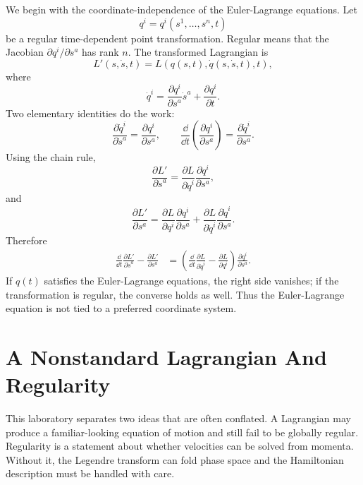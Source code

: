 We begin with the coordinate-independence of the Euler-Lagrange equations. Let
\[
  q^i=q^i(s^1,\ldots,s^n,t)
\]
be a regular time-dependent point transformation. Regular means that the
Jacobian \(\partial q^i/\partial s^a\) has rank \(n\). The transformed
Lagrangian is
\[
  L'(s,\dot s,t)=L(q(s,t),\dot q(s,\dot s,t),t),
\]
where
\[
  \dot q^i
  =
  \frac{\partial q^i}{\partial s^a}\dot s^a
  +
  \frac{\partial q^i}{\partial t}.
\]
Two elementary identities do the work:
\[
  \frac{\partial \dot q^i}{\partial \dot s^a}
  =
  \frac{\partial q^i}{\partial s^a},
  \qquad
  \frac{\dd}{\dd t}
  \left(
    \frac{\partial q^i}{\partial s^a}
  \right)
  =
  \frac{\partial \dot q^i}{\partial s^a}.
\]
Using the chain rule,
\[
  \frac{\partial L'}{\partial \dot s^a}
  =
  \frac{\partial L}{\partial \dot q^i}
  \frac{\partial q^i}{\partial s^a},
\]
and
\[
  \frac{\partial L'}{\partial s^a}
  =
  \frac{\partial L}{\partial q^i}
  \frac{\partial q^i}{\partial s^a}
  +
  \frac{\partial L}{\partial \dot q^i}
  \frac{\partial \dot q^i}{\partial s^a}.
\]
Therefore
\[
\begin{aligned}
  \frac{\dd}{\dd t}\frac{\partial L'}{\partial \dot s^a}
  -
  \frac{\partial L'}{\partial s^a}
  &=
  \left(
    \frac{\dd}{\dd t}\frac{\partial L}{\partial\dot q^i}
    -
    \frac{\partial L}{\partial q^i}
  \right)
  \frac{\partial q^i}{\partial s^a}.
\end{aligned}
\]
If \(q(t)\) satisfies the Euler-Lagrange equations, the right side vanishes;
if the transformation is regular, the converse holds as well. Thus the
Euler-Lagrange equation is not tied to a preferred coordinate system.

\section{A Nonstandard Lagrangian And Regularity}
\label{sec:lab-nonstandard-lagrangian}

This laboratory separates two ideas that are often conflated. A Lagrangian may
produce a familiar-looking equation of motion and still fail to be globally
regular. Regularity is a statement about whether velocities can be solved from
momenta. Without it, the Legendre transform can fold phase space and the
Hamiltonian description must be handled with care.

